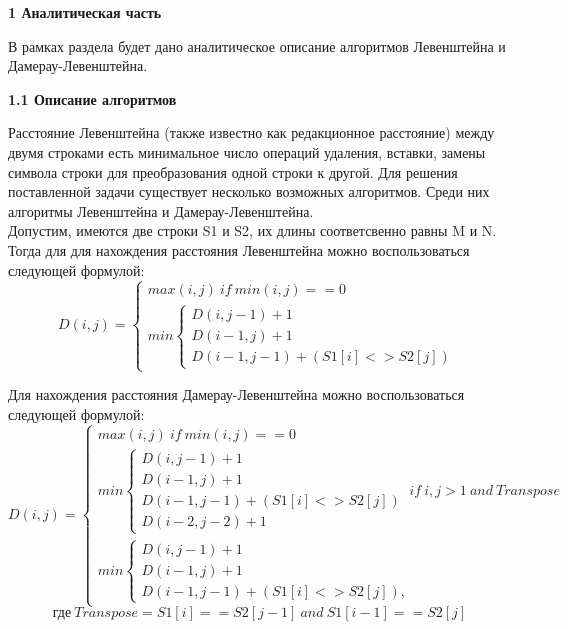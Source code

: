 \documentclass[a4paper,12pt]{report}
\begin{document}
    \begin{center}
        \textbf{1 Аналитическая часть}
        \label{sec:analitic_part}
        \begin{flushleft}
        	В рамках раздела будет дано аналитическое описание алгоритмов Левенштейна и Дамерау-Левенштейна.
        \end{flushleft}

        \textbf{1.1 Описание алгоритмов\\}
        \vspace{0,5cm}
        
        \begin{flushleft}
	        Расстояние Левенштейна (также известно как редакционное расстояние) между двумя строками есть минимальное число операций удаления, вставки, замены символа строки для преобразования одной строки к другой. Для решения поставленной задачи существует несколько возможных алгоритмов. Среди них алгоритмы Левенштейна и Дамерау-Левенштейна.\\
	       	\vspace{0,5cm}
	        Допустим, имеются две строки S1 и S2, их длины соответсвенно равны M и N. Тогда для для нахождения расстояния Левенштейна можно воспользоваться следующей формулой:\\
        	
	        \[
	        D(i,j)=\begin{cases}
	        max(i,j)\ if\ min(i,j) == 0\\
	        min\begin{cases}
	        D(i,j-1) + 1\\
	        D(i-1,j) + 1\\
	        D(i-1,j-1) + (S1[i] <> S2[j])
	        \end{cases}
	        \end{cases}
	        \]
	    
		    	Для нахождения расстояния Дамерау-Левенштейна можно воспользоваться следующей формулой:\\
		    	
		    	\[
		    	D(i,j)=\begin{cases}
		    	max(i,j)\ if\ min(i,j) == 0\\
		    	min\begin{cases}
		    	D(i,j-1) + 1\\
		    	D(i-1,j) + 1\\
		    	D(i-1,j-1) + (S1[i] <> S2[j])\\
		    	D(i-2,j-2) + 1
		    	\end{cases} \ if \ i,j>1 \ and \ Transpose\\
		    	min\begin{cases}
		    	D(i,j-1) + 1\\
		    	D(i-1,j) + 1\\
		    	D(i-1,j-1) + (S1[i] <> S2[j]),
		    	\end{cases}
		    	\end{cases}
		    	\]
		    	\[ \texttt{где} \ Transpose = S1[i] == S2[j-1] \ and \ S1[i-1] == S2[j] \]
	    	\end{flushleft}
    \end{center}
\end{document}
